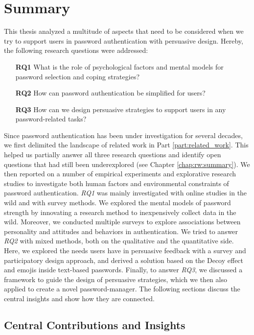 \chapter[Summary]{Summary}\label{chap:summary}
This thesis analyzed a multitude of aspects that need to be considered when we try to support users in password authentication with persuasive design. Hereby, the following research questions were addressed:

\begin{itemize}
	\item[\textbf{RQ1}] What is the role of psychological factors and mental models for password selection and coping strategies?
	\item[\textbf{RQ2}] How can password authentication be simplified for users? 
	\item[\textbf{RQ3}] How can we design persuasive strategies to support users in any password-related tasks?
\end{itemize}

Since password authentication has been under investigation for several decades, we first delimited the landscape of related work in Part \ref{part:related_work}. This helped us partially answer all three research questions and identify open questions that had still been underexplored (see Chapter \ref{chap:rw:summary}). We then reported on a number of empirical experiments and explorative research studies to investigate both human factors and environmental constraints of password authentication. \textit{RQ1} was mainly investigated with online studies in the wild and with survey methods. We explored the mental models of password strength by innovating a research method to inexpensively collect data in the wild. Moreover, we conducted multiple surveys to explore associations between personality and attitudes and behaviors in authentication. We tried to answer \textit{RQ2} with mixed methods, both on the qualitative and the quantitative side. Here, we explored the needs users have in persuasive feedback with a survey and participatory design approach, and derived a solution based on the Decoy effect and emojis inside text-based passwords. Finally, to answer \textit{RQ3}, we discussed a framework to guide the design of persuasive strategies, which we then also applied to create a novel password-manager. The following sections discuss the central insights and show how they are connected.

\section{Central Contributions and Insights}
